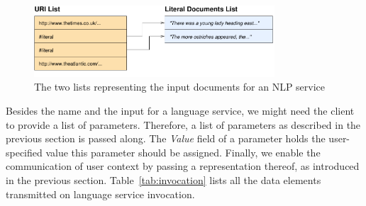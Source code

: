 \begin{figure}
  \centering
  \includegraphics[width=0.8\textwidth]{pictures/twolists}
  \vspace*{-0.4cm}
  \caption{The two lists representing the input documents for an NLP service}  
  \label{fig:twolists}
\end{figure}

Besides the name and the input for a language service, we might need
the client to provide a list of parameters. Therefore, a list of
parameters as described in the previous section is passed along. The
\emph{Value} field of a parameter holds the user-specified value this
parameter should be assigned. Finally, we enable the communication of
user context by passing a representation thereof, as introduced in the
previous section. Table~\ref{tab:invocation} lists all the data
elements transmitted on language service invocation.

